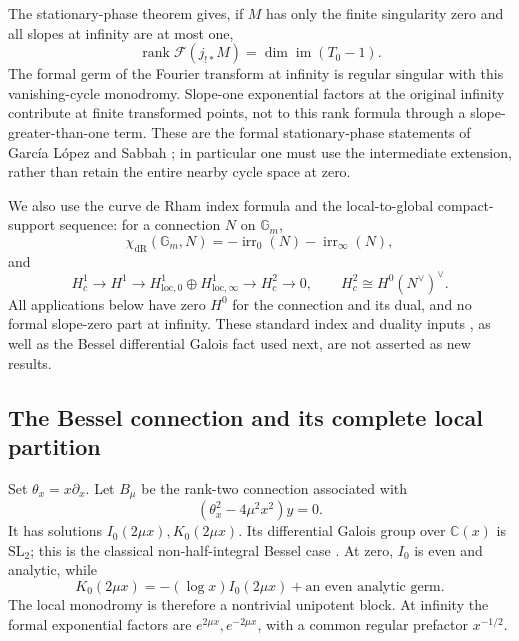 \documentclass[11pt,a4paper]{article}
\theoremstyle{definition}
\theoremstyle{remark}
\numberwithin{equation}{section}
\begin{document}
The stationary-phase theorem gives, if $M$ has only the finite
singularity zero and all slopes at infinity are at most one,
\begin{equation}\label{p7:bg:Fourierfact}
 \operatorname{rank}\mathcal F(j_{!*}M)
       =\dim\operatorname{im}(T_0-1).
\end{equation}
The formal germ of the Fourier transform at infinity is regular
singular with this vanishing-cycle monodromy.  Slope-one exponential
factors at the original infinity contribute at finite transformed
points, not to this rank formula through a slope-greater-than-one
term.  These are the formal stationary-phase statements of
Garc\'ia L\'opez and Sabbah
\cite{p5:BG_GarciaLopez2004,p5:BG_Sabbah2008}; in particular one must use
the intermediate extension, rather than retain the entire nearby
cycle space at zero.

We also use the curve de Rham index formula and the local-to-global
compact-support sequence: for a connection $N$ on $\mathbb G_m$,
\[
 \chi_{\mathrm{dR}}(\mathbb G_m,N)
             =-\operatorname{irr}_0(N)-\operatorname{irr}_\infty(N),
\]
and
\[
 H_c^1\longrightarrow H^1\longrightarrow
 H^1_{\mathrm{loc},0}\oplus H^1_{\mathrm{loc},\infty}
                   \longrightarrow H_c^2\longrightarrow0,
 \qquad H_c^2\cong H^0(N^\vee)^\vee.
\]
All applications below have zero $H^0$ for the connection and its
dual, and no formal slope-zero part at infinity.  These standard
index and duality inputs \cite{p5:BG_Malgrange1991}, as well as the Bessel differential Galois
fact used next, are not asserted as new results.

\subsection{The Bessel connection and its complete local partition}

Set $\theta_x=x\partial_x$.  Let $B_\mu$ be the rank-two connection
associated with
\begin{equation}\label{p7:bg:Bessel}
 (\theta_x^2-4\mu^2x^2)y=0.
\end{equation}
It has solutions $I_0(2\mu x),K_0(2\mu x)$.
Its differential Galois group over $\mathbb C(x)$ is
$\mathrm{SL}_2$; this is the classical non-half-integral Bessel
case \cite{p5:BG_Kolchin1968,p5:BG_vdPS2003}.  At zero, $I_0$ is even and analytic, while
\[
 K_0(2\mu x)=-(\log x)I_0(2\mu x)+\text{an even analytic germ}.
\]
The local monodromy is therefore a nontrivial unipotent block.
At infinity the formal exponential factors are
$e^{2\mu x},e^{-2\mu x}$, with a common regular prefactor
$x^{-1/2}$.
\end{document}
